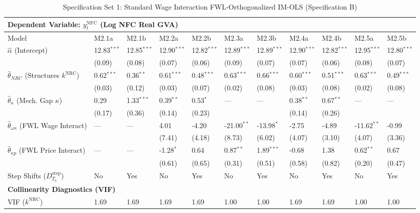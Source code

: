 \begin{table}[H]
\centering
\setlength{\tabcolsep}{2.5pt}
\caption{Specification Set 1: Standard Wage Interaction FWL-Orthogonalized IM-OLS (Specification B)}
\label{tab:specB_set1}
\scriptsize
\begin{tabular}{p{3.8cm}p{1.1cm}p{1.1cm}p{1.1cm}p{1.1cm}p{1.1cm}p{1.1cm}p{1.1cm}p{1.1cm}p{1.1cm}p{1.1cm}}
\toprule
\multicolumn{11}{l}{\textbf{Dependent Variable: $y_t^{\text{NFC}}$ (Log NFC Real GVA)}} \\
\midrule
Model & M2.1a & M2.1b & M2.2a & M2.2b & M2.3a & M2.3b & M2.4a & M2.4b & M2.5a & M2.5b \\
\midrule
$\hat{\alpha}$ (Intercept) & 12.83$^{***}$ & 12.85$^{***}$ & 12.90$^{***}$ & 12.82$^{***}$ & 12.89$^{***}$ & 12.89$^{***}$ & 12.90$^{***}$ & 12.82$^{***}$ & 12.95$^{***}$ & 12.80$^{***}$ \\
 & (0.09) & (0.08) & (0.07) & (0.06) & (0.09) & (0.07) & (0.07) & (0.06) & (0.08) & (0.07) \\
$\hat{\theta}_{NRC}$ (Structures $k^{\text{NRC}}$) & 0.62$^{***}$ & 0.36$^{**}$ & 0.61$^{***}$ & 0.48$^{***}$ & 0.63$^{***}$ & 0.66$^{***}$ & 0.60$^{***}$ & 0.51$^{***}$ & 0.63$^{***}$ & 0.49$^{***}$ \\
 & (0.03) & (0.12) & (0.03) & (0.07) & (0.02) & (0.08) & (0.03) & (0.08) & (0.02) & (0.08) \\
$\hat{\theta}_{\kappa}$ (Mech. Gap $\kappa$) & 0.29 & 1.33$^{***}$ & 0.39$^{**}$ & 0.53$^{*}$ & --- & --- & 0.38$^{**}$ & 0.67$^{**}$ & --- & --- \\
 & (0.17) & (0.36) & (0.14) & (0.23) &  &  & (0.14) & (0.26) &  &  \\
$\hat{\theta}_{\omega\kappa}$ (FWL Wage Interact) & --- & --- & 4.01 & -4.20 & -21.00$^{**}$ & -13.98$^{*}$ & -2.75 & -4.89 & -11.62$^{**}$ & -0.99 \\
 &  &  & (7.41) & (4.18) & (8.73) & (6.02) & (4.07) & (3.10) & (4.07) & (3.36) \\
$\hat{\theta}_{\kappa p}$ (FWL Price Interact) & --- & --- & -1.28$^{*}$ & 0.64 & 0.87$^{**}$ & 1.89$^{***}$ & -0.68 & 1.38 & 0.62$^{**}$ & 0.67 \\
 &  &  & (0.61) & (0.65) & (0.31) & (0.51) & (0.58) & (0.82) & (0.20) & (0.47) \\
Step Shifts ($D_{T_b}^{\text{step}}$) & No & Yes & No & Yes & No & Yes & No & Yes & No & Yes \\
\midrule
\multicolumn{11}{l}{\textbf{Collinearity Diagnostics (VIF)}} \\
VIF ($k^{\text{NRC}}$) & 1.69 & 1.69 & 1.69 & 1.69 & 1.00 & 1.00 & 1.69 & 1.69 & 1.00 & 1.00 \\

\end{tabular}
\end{table}
